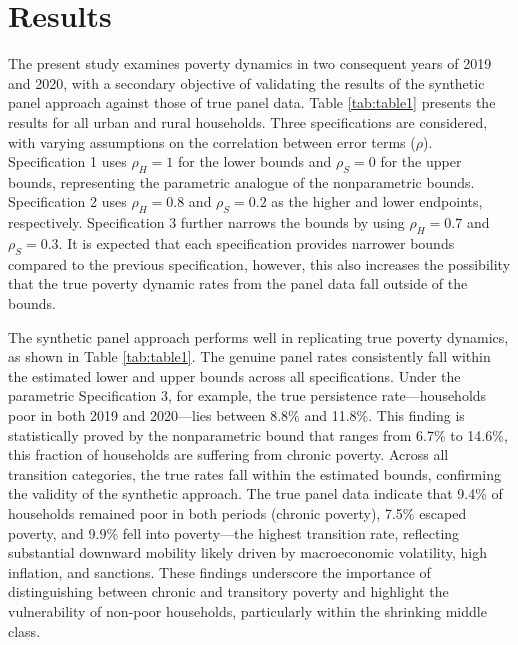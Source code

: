 \documentclass[12pt,a4paper]{article}
\begin{document}
\section{Results}
The present study examines poverty dynamics in two consequent years of 2019 and 2020, with a secondary objective of validating the results of the synthetic panel approach against those of true panel data. Table \autoref{tab:table1} presents the results for all urban and rural households. Three specifications are considered, with varying assumptions on the correlation between error terms ($\rho$).
Specification 1 uses $\rho_H=1$ for the lower bounds and $\rho_S=0$ for the upper bounds, representing the parametric analogue of the nonparametric bounds. Specification 2 uses $\rho_H=0.8$ and $\rho_S=0.2$ as the higher and lower endpoints, respectively. Specification 3 further narrows the bounds by using $\rho_H=0.7$ and $\rho_S=0.3$. It is expected that each specification provides narrower bounds compared to the previous specification, however, this also increases the possibility that the true poverty dynamic rates from the panel data fall outside of the bounds.



The synthetic panel approach performs well in replicating true poverty dynamics, as shown in Table \autoref{tab:table1}. The genuine panel rates consistently fall within the estimated lower and upper bounds across all specifications. Under the parametric Specification 3, for example, the true persistence rate—households poor in both 2019 and 2020—lies between 8.8\% and 11.8\%. This finding is statistically proved by the nonparametric bound that ranges from 6.7\% to 14.6\%, this fraction of households are suffering from chronic poverty. Across all transition categories, the true rates fall within the estimated bounds, confirming the validity of the synthetic approach. The true panel data indicate that 9.4\% of households remained poor in both periods (chronic poverty), 7.5\% escaped poverty, and 9.9\% fell into poverty—the highest transition rate, reflecting substantial downward mobility likely driven by macroeconomic volatility, high inflation, and sanctions. These findings underscore the importance of distinguishing between chronic and transitory poverty and highlight the vulnerability of non-poor households, particularly within the shrinking middle class.
\end{document}
